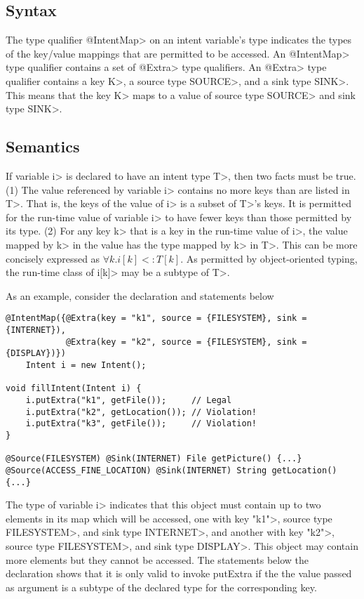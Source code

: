 \subsection{Syntax}
The type qualifier \<@IntentMap> on an intent variable's type indicates the 
types of the key/value mappings that are permitted to be accessed.
An \<@IntentMap> type qualifier contains a set of \<@Extra> type qualifiers. An
\<@Extra> type qualifier contains a key \<K>, a source type \<SOURCE>, and a 
sink type \<SINK>. This means that the key \<K> maps to a value of source type 
\<SOURCE> and sink type \<SINK>.

\subsection{Semantics}
If variable \<i> is declared to have an intent type \<T>, then two facts must be
true. (1) The value referenced by variable \<i> contains no more keys than are
listed in \<T>. That is, the keys of the value of \<i> is a subset of \<T>'s
keys. It is
permitted for the run-time value of variable \<i> to have fewer keys than those
permitted by its type. (2) For any key \<k> that is a key in the run-time value
of \<i>, the value mapped by \<k> in the value has the type mapped by \<k> in
\<T>. This can be more concisely expressed as $\forall k.i[k] <: T[k]$. As permitted by
object-oriented typing, the run-time class of \<i[k]> may be a subtype of \<T>.

As an example, consider the declaration and statements below

\begin{Verbatim}
@IntentMap({@Extra(key = "k1", source = {FILESYSTEM}, sink = {INTERNET}),
            @Extra(key = "k2", source = {FILESYSTEM}, sink = {DISPLAY})}) 
    Intent i = new Intent();

void fillIntent(Intent i) {
    i.putExtra("k1", getFile());     // Legal
    i.putExtra("k2", getLocation()); // Violation!
    i.putExtra("k3", getFile());     // Violation!
}

@Source(FILESYSTEM) @Sink(INTERNET) File getPicture() {...}
@Source(ACCESS_FINE_LOCATION) @Sink(INTERNET) String getLocation() {...}

\end{Verbatim}

\noindent
The type of variable \<i> indicates that this object must contain up to two
elements in its map which
will be accessed, one with key \<"k1">, source type \<FILESYSTEM>, and sink type
\<INTERNET>, and another with key \<"k2">, source type \<FILESYSTEM>, and sink
type \<DISPLAY>. This object may contain more elements but they cannot be
accessed. The statements below the declaration shows that it is only valid to
invoke putExtra if the the value passed as argument is a subtype of the declared
type for the corresponding key.


